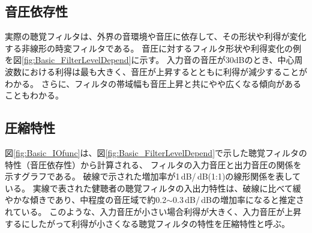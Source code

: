 

\newpage
\subsection{音圧依存性}
\label{sec:FilterLevelDepend}
実際の聴覚フィルタは、外界の音環境や音圧に依存して、その形状や利得が変化する非線形の時変フィルタである。
音圧に対するフィルタ形状や利得変化の例を図\ref{fig:Basic_FilterLevelDepend}に示す。
入力音の音圧が30dBのとき、中心周波数における利得は最も大きく、音圧が上昇するとともに利得が減少することがわかる。
さらに、フィルタの帯域幅も音圧上昇と共にやや広くなる傾向があることもわかる。
    
\subsection{圧縮特性}
\label{sec:IOfunc}
図\ref{fig:Basic_IOfunc}は、図\ref{fig:Basic_FilterLevelDepend}で示した聴覚フィルタの特性（音圧依存性）から計算される、
フィルタの入力音圧と出力音圧の関係を示すグラフである。
破線で示された増加率が1\,dB/\,dB(1:1)の線形関係を表している。
実線で表された健聴者の聴覚フィルタの入出力特性は、破線に比べて緩やかな傾きであり、中程度の音圧域で約0.2$\sim$0.3\,dB/\,dBの増加率になると推定されている。
このような、入力音圧が小さい場合利得が大きく、入力音圧が上昇するにしたがって利得が小さくなる聴覚フィルタの特性を圧縮特性と呼ぶ。

